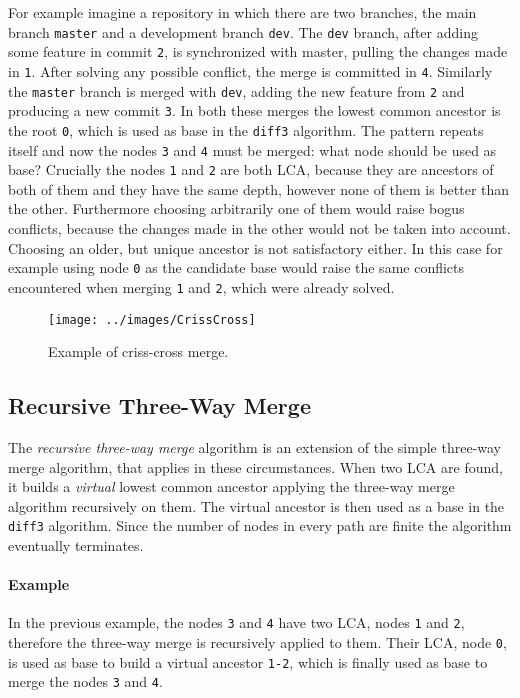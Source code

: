 \documentclass[../Thesis.tex]{subfiles}
\begin{document}
	For example imagine a repository in which there are two branches,
	the main branch \texttt{master} and a development branch \texttt{dev}.
	The \texttt{dev} branch, after adding some feature in commit \texttt{2},
	is synchronized with master, pulling the changes made in \texttt{1}.
	After solving any possible conflict, the merge is committed in \texttt{4}.
	Similarly the \texttt{master} branch is merged with \texttt{dev}, 
	adding the new feature from \texttt{2} and producing a new commit 
	\texttt{3}.
	In both these merges the lowest common ancestor is the root \texttt{0},
	which is used as base in the \texttt{diff3} algorithm.
	The pattern repeats itself and now the nodes \texttt{3} and \texttt{4}
	must be merged: what node should be used as base?
	Crucially the nodes \texttt{1} and \texttt{2} are both LCA, because they are 
	ancestors of both of them and they have the same depth, however
	none of them is better than the other.
	Furthermore choosing arbitrarily one of them would raise bogus conflicts,
	because the changes made in the other would not be taken into account.
	Choosing an older, but unique ancestor is not satisfactory either.
	In this case for example using node \texttt{0} as the candidate base would
	raise the same conflicts encountered when merging \texttt{1} and \texttt{2},
	which were already solved.
	
\begin{figure}[h]
\centering
\texttt{[image: ../images/CrissCross]}
\caption{Example of criss-cross merge.}
\label{CrissCrossImg}
\end{figure}
	
	\subsection{Recursive Three-Way Merge}
	The \emph{recursive three-way merge} algorithm is an extension
	of the simple three-way merge algorithm, that applies in these
	circumstances.
	When two LCA are found, it builds a \emph{virtual} lowest common 
	ancestor applying the three-way merge algorithm recursively on them.
	The virtual ancestor is then used as a base in the \texttt{diff3} algorithm.
	Since the number of nodes in every path are finite the algorithm 
	eventually terminates.

	\paragraph{Example}
	In the previous example, the nodes \texttt{3} and \texttt{4} have
	two LCA, nodes \texttt{1} and \texttt{2}, therefore the three-way merge 
	is recursively applied to them. Their LCA, node \texttt{0}, is used as base
	to build a virtual ancestor \texttt{1-2}, which is finally used as base to 
	merge the nodes \texttt{3} and \texttt{4}.
	
\end{document}
